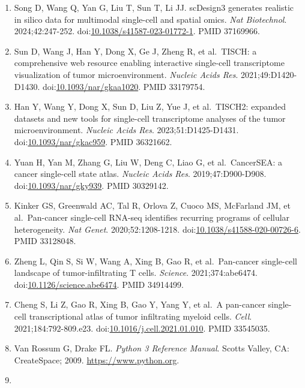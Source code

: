 \documentclass{article}
\begin{document}
\begin{enumerate}
  doi:\href{https://doi.org/10.1186/s13059-021-02367-2}{10.1186/s13059-021-02367-2}.
  PMID 34034771.
\item
  Song D, Wang Q, Yan G, Liu T, Sun T, Li JJ. scDesign3 generates
  realistic in silico data for multimodal single-cell and spatial omics.
  \emph{Nat Biotechnol}. 2024;42:247-252.
  doi:\href{https://doi.org/10.1038/s41587-023-01772-1}{10.1038/s41587-023-01772-1}.
  PMID 37169966.
\item
  Sun D, Wang J, Han Y, Dong X, Ge J, Zheng R, et al.~TISCH: a
  comprehensive web resource enabling interactive single-cell
  transcriptome visualization of tumor microenvironment. \emph{Nucleic
  Acids Res}. 2021;49:D1420-D1430.
  doi:\href{https://doi.org/10.1093/nar/gkaa1020}{10.1093/nar/gkaa1020}.
  PMID 33179754.
\item
  Han Y, Wang Y, Dong X, Sun D, Liu Z, Yue J, et al.~TISCH2: expanded
  datasets and new tools for single-cell transcriptome analyses of the
  tumor microenvironment. \emph{Nucleic Acids Res}. 2023;51:D1425-D1431.
  doi:\href{https://doi.org/10.1093/nar/gkac959}{10.1093/nar/gkac959}.
  PMID 36321662.
\item
  Yuan H, Yan M, Zhang G, Liu W, Deng C, Liao G, et al.~CancerSEA: a
  cancer single-cell state atlas. \emph{Nucleic Acids Res}.
  2019;47:D900-D908.
  doi:\href{https://doi.org/10.1093/nar/gky939}{10.1093/nar/gky939}.
  PMID 30329142.
\item
  Kinker GS, Greenwald AC, Tal R, Orlova Z, Cuoco MS, McFarland JM, et
  al.~Pan-cancer single-cell RNA-seq identifies recurring programs of
  cellular heterogeneity. \emph{Nat Genet}. 2020;52:1208-1218.
  doi:\href{https://doi.org/10.1038/s41588-020-00726-6}{10.1038/s41588-020-00726-6}.
  PMID 33128048.
\item
  Zheng L, Qin S, Si W, Wang A, Xing B, Gao R, et al.~Pan-cancer
  single-cell landscape of tumor-infiltrating T cells. \emph{Science}.
  2021;374:abe6474.
  doi:\href{https://doi.org/10.1126/science.abe6474}{10.1126/science.abe6474}.
  PMID 34914499.
\item
  Cheng S, Li Z, Gao R, Xing B, Gao Y, Yang Y, et al.~A pan-cancer
  single-cell transcriptional atlas of tumor infiltrating myeloid cells.
  \emph{Cell}. 2021;184:792-809.e23.
  doi:\href{https://doi.org/10.1016/j.cell.2021.01.010}{10.1016/j.cell.2021.01.010}.
  PMID 33545035.
\item
  Van Rossum G, Drake FL. \emph{Python 3 Reference Manual}. Scotts
  Valley, CA: CreateSpace; 2009. \url{https://www.python.org}.
\item

\end{enumerate}
\end{document}
